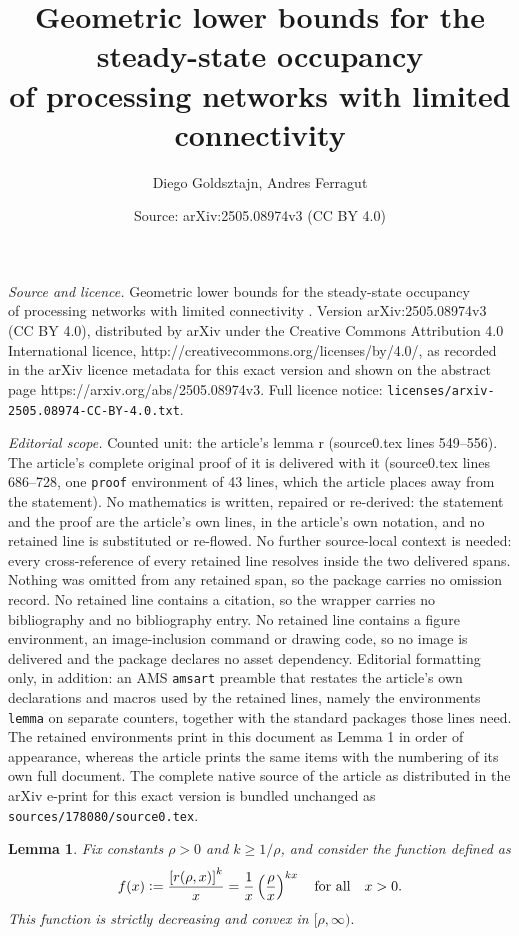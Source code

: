 \documentclass[10pt,a4paper]{amsart}
\title{Geometric lower bounds for the steady-state occupancy\\ of processing networks with limited connectivity \vspace{\baselineskip}}
\author{Diego Goldsztajn, Andres Ferragut}
\date{Source: arXiv:2505.08974v3 (CC BY 4.0)}
\newtheorem{lemma}{Lemma}
\newcommand{\defeq}{\vcentcolon=}
\begin{document}
\maketitle

\noindent\emph{Source and licence.} Geometric lower bounds for the steady-state occupancy\\ of processing networks with limited connectivity \vspace{\baselineskip}. Version arXiv:2505.08974v3 (CC BY 4.0), distributed by arXiv under the Creative Commons Attribution 4.0 International licence, http://creativecommons.org/licenses/by/4.0/, as recorded in the arXiv licence metadata for this exact version and shown on the abstract page https://arxiv.org/abs/2505.08974v3. Full licence notice: \texttt{licenses/arxiv-2505.08974-CC-BY-4.0.txt}.\par\smallskip

\noindent\textit{Editorial scope.} Counted unit: the article's lemma r (source0.tex lines 549--556). The article's complete original proof of it is delivered with it (source0.tex lines 686--728, one \texttt{proof} environment of 43 lines, which the article places away from the statement). No mathematics is written, repaired or re-derived: the statement and the proof are the article's own lines, in the article's own notation, and no retained line is substituted or re-flowed.  No further source-local context is needed: every cross-reference of every retained line resolves inside the two delivered spans.  Nothing was omitted from any retained span, so the package carries no omission record.  No retained line contains a citation, so the wrapper carries no bibliography and no bibliography entry.  No retained line contains a figure environment, an image-inclusion command or drawing code, so no image is delivered and the package declares no asset dependency.  Editorial formatting only, in addition: an AMS \texttt{amsart} preamble that restates the article's own declarations and macros used by the retained lines, namely the environments \texttt{lemma} on separate counters, together with the standard packages those lines need.  The retained environments print in this document as Lemma 1 in order of appearance, whereas the article prints the same items with the numbering of its own full document.  The complete native source of the article as distributed in the arXiv e-print for this exact version is bundled unchanged as \texttt{sources/178080/source0.tex}.
\begin{lemma}
	\label{lem: properties of r}
	Fix constants $\rho > 0$ and $k \geq 1 / \rho$, and consider the function defined as
	\begin{equation*}
		f(x) \defeq \frac{\left[r(\rho, x)\right]^k}{x} = \frac{1}{x}\left(\frac{\rho}{x}\right)^{kx} \quad \text{for all} \quad x > 0.
	\end{equation*}
	This function is strictly decreasing and convex in $[\rho, \infty).$
\end{lemma}
\end{document}

